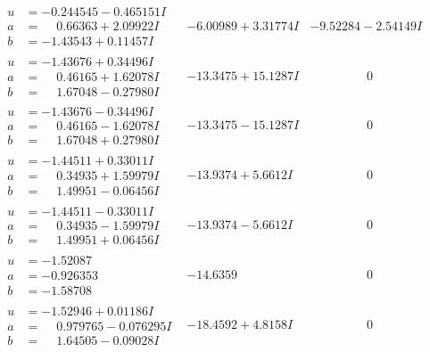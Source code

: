 \documentclass[1p]{elsarticle_modified}
\theoremstyle{definition}
\begin{document}
$$\begin{array}{c|c|c}
\begin{aligned}
u &= -0.244545 - 0.465151 I \\
a &= \phantom{-}0.66363 + 2.09922 I \\
b &= -1.43543 + 0.11457 I\end{aligned}
 & -6.00989 + 3.31774 I & -9.52284 - 2.54149 I \\ \hline\begin{aligned}
u &= -1.43676 + 0.34496 I \\
a &= \phantom{-}0.46165 + 1.62078 I \\
b &= \phantom{-}1.67048 - 0.27980 I\end{aligned}
 & -13.3475 + 15.1287 I & \phantom{-0.000000 } 0 \\ \hline\begin{aligned}
u &= -1.43676 - 0.34496 I \\
a &= \phantom{-}0.46165 - 1.62078 I \\
b &= \phantom{-}1.67048 + 0.27980 I\end{aligned}
 & -13.3475 - 15.1287 I & \phantom{-0.000000 } 0 \\ \hline\begin{aligned}
u &= -1.44511 + 0.33011 I \\
a &= \phantom{-}0.34935 + 1.59979 I \\
b &= \phantom{-}1.49951 - 0.06456 I\end{aligned}
 & -13.9374 + 5.6612 I & \phantom{-0.000000 } 0 \\ \hline\begin{aligned}
u &= -1.44511 - 0.33011 I \\
a &= \phantom{-}0.34935 - 1.59979 I \\
b &= \phantom{-}1.49951 + 0.06456 I\end{aligned}
 & -13.9374 - 5.6612 I & \phantom{-0.000000 } 0 \\ \hline\begin{aligned}
u &= -1.52087\phantom{ +0.000000I} \\
a &= -0.926353\phantom{ +0.000000I} \\
b &= -1.58708\phantom{ +0.000000I}\end{aligned}
 & -14.6359\phantom{ +0.000000I} & \phantom{-0.000000 } 0 \\ \hline\begin{aligned}
u &= -1.52946 + 0.01186 I \\
a &= \phantom{-}0.979765 - 0.076295 I \\
b &= \phantom{-}1.64505 - 0.09028 I\end{aligned}
 & -18.4592 + 4.8158 I & \phantom{-0.000000 } 0\\

\end{array}$$
\end{document}

